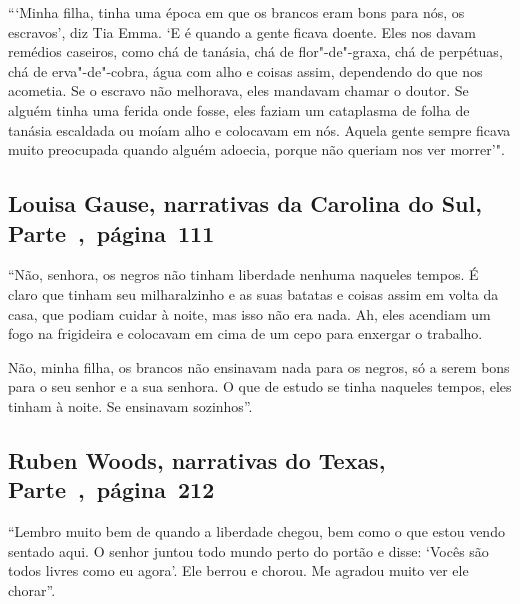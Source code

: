 ```Minha filha, tinha uma época em que os brancos eram bons para nós, os
escravos', diz Tia Emma. `E é quando a gente ficava doente. Eles nos
davam remédios caseiros, como chá de tanásia, chá de flor"-de"-graxa, chá
de perpétuas, chá de erva"-de"-cobra, água com alho e coisas assim,
dependendo do que nos acometia. Se o escravo não melhorava, eles
mandavam chamar o doutor. Se alguém tinha uma ferida onde fosse, eles
faziam um cataplasma de folha de tanásia escaldada ou moíam alho e
colocavam em nós. Aquela gente sempre ficava muito preocupada quando
alguém adoecia, porque não queriam nos ver morrer'".

\subsection{Louisa Gause, narrativas da Carolina do Sul, Parte~,~página~111} 
\label{ref103}

``Não, senhora, os negros não tinham liberdade nenhuma naqueles tempos.
É claro que tinham seu milharalzinho e as suas batatas e coisas assim em
volta da casa, que podiam cuidar à noite, mas isso não era nada. Ah,
eles acendiam um fogo na frigideira e colocavam em cima de um cepo para
enxergar o trabalho.

Não, minha filha, os brancos não ensinavam nada para os negros, só a
serem bons para o seu senhor e a sua senhora. O que de estudo se tinha
naqueles tempos, eles tinham à noite. Se ensinavam sozinhos''.

\subsection{Ruben Woods, narrativas do Texas, Parte~,~página~212}
\label{ref314}

``Lembro muito bem de quando a liberdade chegou, bem como o que estou
vendo sentado aqui. O senhor juntou todo mundo perto do portão e disse:
`Vocês são todos livres como eu agora'. Ele berrou e chorou. Me agradou
muito ver ele chorar''.

